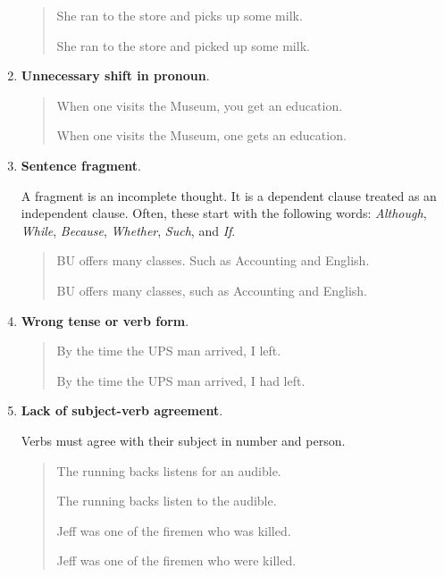 \begin{enumerate}
\begin{quote}
She ran to the store and picks up some milk.      

She ran to the store and picked up some milk.      
\end{quote}

\item \textbf{Unnecessary shift in pronoun}.

\begin{quote}
When one visits the Museum, you get an education.      

When one visits the Museum, one gets an education.      

\end{quote}

\item  \textbf{Sentence fragment}.

A fragment is an incomplete thought. It is a dependent clause treated as an independent clause. Often, these start with the following words: \emph{Although}, \emph{While}, \emph{Because}, \emph{Whether}, \emph{Such}, and \emph{If}.

\begin{quote}
BU offers many classes. Such as Accounting and English.      

BU offers many classes, such as Accounting and English.      
\end{quote}

\item \textbf{Wrong tense or verb form}.

\begin{quote}
By the time the UPS man arrived, I left.      

By the time the UPS man arrived, I had left.      
\end{quote}
\item\textbf{ Lack of subject-verb agreement}.

Verbs must agree with their subject in number and person. 

\begin{quote}
The running backs listens for an audible.      

The running backs listen to the audible.      

Jeff was one of the firemen who was killed.      

Jeff was one of the firemen who were killed.      
\end{quote}


\end{enumerate}
